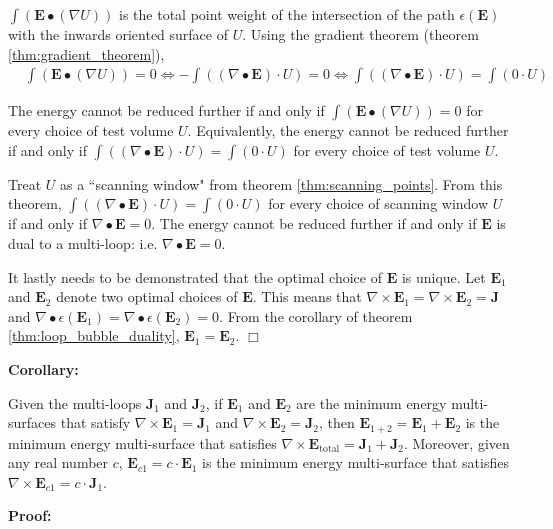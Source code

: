 \(\int (\mathbf{E} \bullet (\nabla U))\) is the total point weight of the intersection of the path \(\epsilon(\mathbf{E})\) with the inwards oriented surface of \(U\). Using the gradient theorem (theorem \ref{thm:gradient_theorem}), 
\begin{align*}
& \int (\mathbf{E} \bullet (\nabla U)) = 0
\iff -\int ((\nabla \bullet \mathbf{E}) \cdot U) = 0 
\iff \int ((\nabla \bullet \mathbf{E}) \cdot U) = \int (0 \cdot U) 
\end{align*}

The energy cannot be reduced further if and only if \(\int (\mathbf{E} \bullet (\nabla U)) = 0\) for every choice of test volume \(U\). Equivalently, the energy cannot be reduced further if and only if \(\int ((\nabla \bullet \mathbf{E}) \cdot U) = \int (0 \cdot U)\) for every choice of test volume \(U\).

Treat \(U\) as a ``scanning window" from theorem \ref{thm:scanning_points}. From this theorem, \(\int ((\nabla \bullet \mathbf{E}) \cdot U) = \int (0 \cdot U)\) for every choice of scanning window \(U\) if and only if \(\nabla \bullet \mathbf{E} = 0\). The energy cannot be reduced further if and only if \(\mathbf{E}\) is dual to a multi-loop: i.e. \(\nabla \bullet \mathbf{E} = 0\).

It lastly needs to be demonstrated that the optimal choice of \(\mathbf{E}\) is unique. Let \(\mathbf{E}_1\) and \(\mathbf{E}_2\) denote two optimal choices of \(\mathbf{E}\). This means that \(\nabla \times \mathbf{E}_1 = \nabla \times \mathbf{E}_2 = \mathbf{J}\) and \(\nabla \bullet \epsilon(\mathbf{E}_1) = \nabla \bullet \epsilon(\mathbf{E}_2) = 0\). From the corollary of theorem \ref{thm:loop_bubble_duality}, \(\mathbf{E}_1 = \mathbf{E}_2\). \(\Box\) 

\textbf{Corollary:}

Given the multi-loops \(\mathbf{J}_1\) and \(\mathbf{J}_2\), if \(\mathbf{E}_1\) and \(\mathbf{E}_2\) are the minimum energy multi-surfaces that satisfy \(\nabla \times \mathbf{E}_1 = \mathbf{J}_1\) and \(\nabla \times \mathbf{E}_2 = \mathbf{J}_2\), then \(\mathbf{E}_{1+2} = \mathbf{E}_1 + \mathbf{E}_2\) is the minimum energy multi-surface that satisfies \(\nabla \times \mathbf{E}_{\text{total}} = \mathbf{J}_1 + \mathbf{J}_2\). Moreover, given any real number \(c\), \(\mathbf{E}_{c1} = c \cdot \mathbf{E}_1\) is the minimum energy multi-surface that satisfies \(\nabla \times \mathbf{E}_{c1} = c \cdot \mathbf{J}_1\).

\textbf{Proof:}

